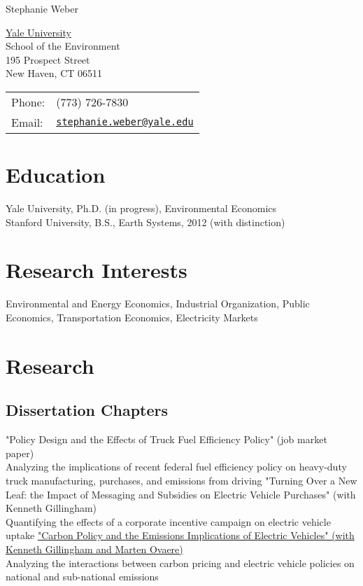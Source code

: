 \documentclass[letterpaper]{article}
\def\name{Stephanie Weber}
\begin{document}
{\huge \name}


\vspace{0.25in}

\begin{minipage}{0.45\linewidth}
  \href{}{Yale University} \\
  School of the Environment \\
  195 Prospect Street \\
  New Haven, CT 06511 
\end{minipage}
\begin{minipage}{0.45\linewidth}
  \begin{tabular}{ll}
    Phone: & (773) 726-7830 \\
    Email: & \href{mailto:stephanie.weber@yale.edu}{\tt stephanie.weber@yale.edu} %
  \end{tabular}
\end{minipage}

\section*{Education}
Yale University, Ph.D. (in progress), Environmental Economics\\
Stanford University, B.S., Earth Systems, 2012 (with distinction)

\section*{Research Interests}
Environmental and Energy Economics, Industrial Organization, Public Economics, Transportation Economics, Electricity Markets

\section*{Research}

\subsection*{Dissertation Chapters}
"Policy Design and the Effects of Truck Fuel Efficiency Policy" (job market paper)\\
Analyzing the implications of recent federal fuel efficiency policy on heavy-duty truck manufacturing, purchases, and emissions from driving
\bigbreak
"Turning Over a New Leaf: the Impact of Messaging and Subsidies on Electric Vehicle Purchases" (with Kenneth Gillingham) \\
Quantifying the effects of a corporate incentive campaign on electric vehicle uptake
\bigbreak
\href{https://www.nber.org/papers/w28620}{"Carbon Policy and the Emissions Implications of Electric Vehicles" (with Kenneth Gillingham and Marten Ovaere)}\\
Analyzing the interactions between carbon pricing and electric vehicle policies on national and sub-national emissions
\end{document}
